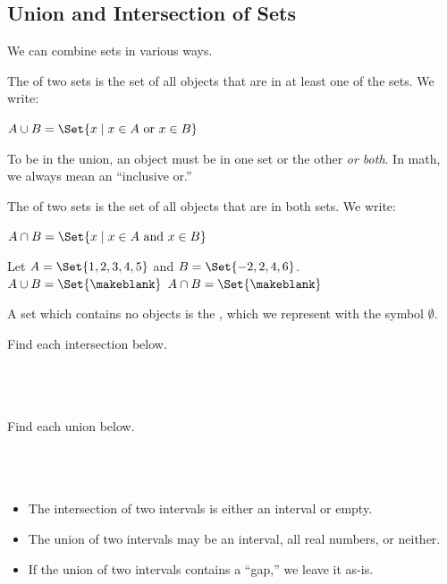\subsection{Union and Intersection of Sets} 
We can combine sets in various ways.
\begin{definition}[Union]
The  of two sets is the set of all objects that are in at least one of the sets. We write:

\noindent\centering$A\cup B=\Set{x\mid x\in A\mbox{ or }x\in B}$
\end{definition}
\begin{Note}To be in the union, an object must be in one set or the other \emph{or both}. In math, we always mean an ``inclusive or.''\end{Note}
\begin{definition}[Intersection]
The  of two sets is the set of all objects that are in both sets. We write:

\noindent\centering$A\cap B=\Set{x\mid x\in A\mbox{ and }x\in B}$
\end{definition}
\begin{Example} Let $A=\Set{1,2,3,4,5}$ and $B=\Set{-2,2,4,6}$.\\[1ex]
$A\cup B=\Set{\makeblank}$\hfill
$A\cap B=\Set{\makeblank}$
\end{Example}
\begin{definition}
A set which contains no objects is the , which we represent with the symbol $\emptyset$.
\end{definition}
\begin{Example}Find each intersection below.\\[1ex]
\makeblankfill[0.6\textwidth]{$(-4,3]\cap\Z=$}\\[1ex]
\makeblankfill[0.6\textwidth]{$(-\infty,2)\cap[1,\infty)=$}\\[1ex]
\\[1ex]
\end{Example}
\begin{Example}Find each union below.\\[1ex]
\\[1ex]
\makeblankfill[0.6\textwidth]{$[-8,\infty)\cup (2,5)=$}\\[1ex]
\makeblankfill[0.6\textwidth]{$(-\infty,2)\cup [1,\infty)=$}\\[1ex]
\makeblankfill[0.6\textwidth]{$(-\infty,-4]\cup (1,3)=$}
\end{Example}
\begin{itemize}
\item The intersection of two intervals is either an interval or empty.
\item The union of two intervals may be an interval, all real numbers, or neither.
\item If the union of two intervals contains a ``gap,'' we leave it as-is.
\end{itemize}